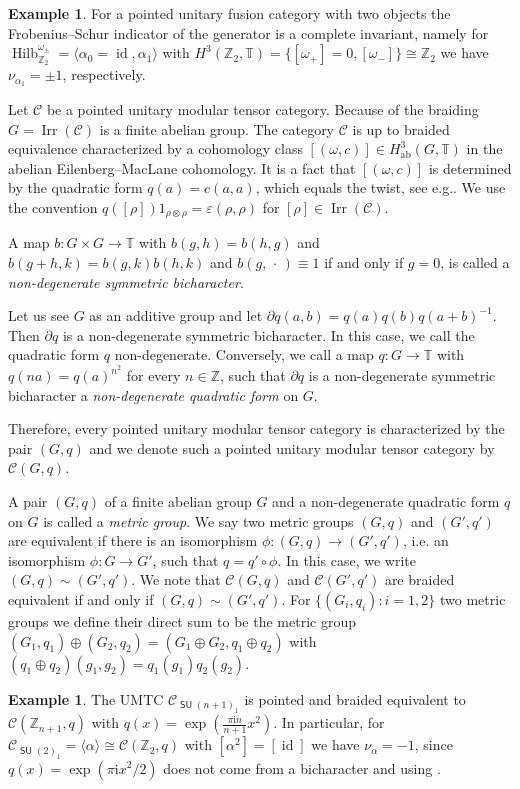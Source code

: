 \documentclass[twoside,11pt,reqno]{amsart}
\makeatletter
\theoremstyle{definition}
\newtheorem{example}[thm]{Example}
\theoremstyle{remark}
\newcommand{\slot}{{~\cdot~}}
\newcommand{\SU}{\mathop{\mathsf{SU}}}
\newcommand{\cC}{\mathcal{C}}
\newcommand{\TT}{\mathbb{T}}
\newcommand{\ZZ}{\mathbb{Z}}
\DeclareMathOperator{\id}{id}
\newcommand{\ima}{\mathrm{i}}
\DeclareRobustCommand{\eg}{e.g.\@\xspace}
\DeclareRobustCommand{\ie}{i.e.\@\xspace}
\DeclareMathOperator{\Vect}{Hilb}
\DeclareMathOperator{\Irr}{Irr}
\newcommand{\umtc}[1]{\cC_{#1}}
\newcommand{\bii}[2]{b( #1,#2)}
\renewcommand{\slot}{\,\cdot\,}
\newcommand{\myemph}[1]{\emph{#1}}
\makeatother
\begin{document}
\begin{example}
  For a pointed unitary fusion category with two objects the Frobenius--Schur 
  indicator of the generator is a complete invariant, namely for 
  $\Vect^{\omega_{\pm}}_{\ZZ_2}=\langle\alpha_0=\id,\alpha_1\rangle$ with
  $H^3(\ZZ_2,\TT)=\{[\omega_+]=0,[\omega_-]\}\cong \ZZ_2$ we have
  $\nu_{\alpha_1}=\pm 1$, respectively.
\end{example}

Let $\cC$ be a pointed unitary modular tensor category.
Because of the braiding $G=\Irr(\cC)$ is a finite abelian group.
The category $\cC$ is up to braided equivalence characterized by a 
cohomology 
class $[(\omega,c)]\in H^3_{\mathrm{ab}}(G,\TT)$ in the abelian 
Eilenberg--MacLane cohomology.
It is a fact that $[(\omega,c)]$ is determined by the quadratic form 
$q(a)=c(a,a)$, which equals %
the twist, see \eg \cite{EtGeNiOs2015}.
We use the convention $q([\rho])1_{\rho\otimes\rho}=\varepsilon(\rho,\rho)$ 
for $[\rho]\in \Irr(\cC)$.

A map $b\colon G\times G \to \TT$ with $\bii gh=\bii hg$
and $\bii{g+h}k=\bii gk\bii hk$ and $\bii g\slot \equiv 1$ if and only if $g=0$, is called a \myemph{non-degenerate symmetric 
bicharacter}. 

Let us see $G$ as an additive group and let 
$\partial q(a,b)=q(a)q(b)q(a+b)^{-1}$. 
Then $\partial q$ is a non-degenerate symmetric 
bicharacter. 
In this case, we call the quadratic form $q$ non-degenerate.
Conversely, we call a map $q\colon G\to \TT$ with $q(na)=q(a)^{n^2}$
for every $n\in \ZZ$, such that $\partial q$ is a non-degenerate symmetric 
bicharacter a \myemph{non-degenerate quadratic form} on $G$. 


Therefore, every pointed unitary modular tensor category 
is characterized by the pair $(G,q)$ and we denote such a pointed 
unitary modular tensor category by $\cC(G,q)$.

A pair $(G,q)$ of a finite abelian group $G$ and a non-degenerate quadratic 
form $q$ on $G$ is called a \myemph{metric group}.
We say two metric groups $(G,q)$ and $(G',q')$ are equivalent if there is an 
isomorphism $\phi\colon (G,q)\to(G',q')$, \ie an isomorphism 
$\phi\colon G\to G'$, such that $q=q'\circ \phi$.
In this case, we write $(G,q)\sim(G',q')$.
We note that $\cC(G,q)$ and $\cC(G',q')$ are braided equivalent if and only 
if $(G,q)\sim(G',q')$.
For $\{(G_i,q_i):i=1,2\}$ two metric groups we define their direct sum to be 
the metric group $(G_1,q_1)\oplus (G_2,q_2)=(G_1\oplus G_2,q_1\oplus q_2)$ 
with $(q_1\oplus q_2)(g_1,g_2)=q_1(g_1)q_2(g_2)$.
\begin{example}
  The UMTC $\umtc{\SU(n+1)_1}$ is pointed and braided equivalent to
  $\cC(\ZZ_{n+1},q)$ with $q(x)=\exp(\frac{\pi\ima n}{n+1} x^2)$.
  In particular, for $\umtc{\SU(2)_1}=\langle\alpha\rangle\cong \cC(\ZZ_2,q)$
  with $[\alpha^2]=[\id]$ we have $\nu_\alpha=-1$, since 
  $q(x)=\exp(\pi\ima x^2/2)$ does not come from a bicharacter and using
  {\cite[Lemma 4.4]{LiNg2014}}.
\end{example}
\end{document}
